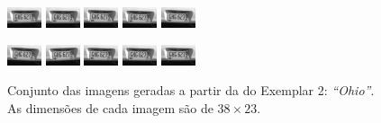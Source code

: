 \begin{figure}[H]
	\centering
	\caption{ Conjunto das imagens geradas a partir da do Exemplar 2: \emph{``Ohio''}.
	As dimensões de cada imagem são de $38 \times 23$.}
	\label{fig:frames2}	
	\includegraphics[width=.15\textwidth]{figures/degradedImg2/result-0.png}
	\includegraphics[width=.15\textwidth]{figures/degradedImg2/result-1.png}
	\includegraphics[width=.15\textwidth]{figures/degradedImg2/result-2.png}
	\includegraphics[width=.15\textwidth]{figures/degradedImg2/result-3.png}
	\includegraphics[width=.15\textwidth]{figures/degradedImg2/result-4.png}

	\includegraphics[width=.15\textwidth]{figures/degradedImg2/result-5.png}
	\includegraphics[width=.15\textwidth]{figures/degradedImg2/result-6.png}
	\includegraphics[width=.15\textwidth]{figures/degradedImg2/result-7.png}
	\includegraphics[width=.15\textwidth]{figures/degradedImg2/result-8.png}
	\includegraphics[width=.15\textwidth]{figures/degradedImg2/result-9.png} 


\end{figure}
